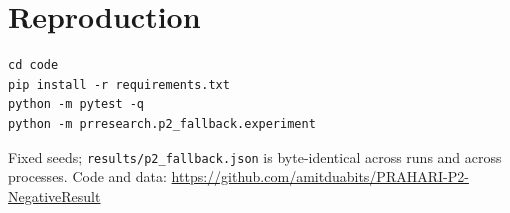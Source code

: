 \documentclass[11pt,a4paper]{article}
\begin{document}
\section*{Reproduction}

\begin{verbatim}
cd code
pip install -r requirements.txt
python -m pytest -q
python -m prresearch.p2_fallback.experiment
\end{verbatim}

Fixed seeds; \texttt{results/p2\_fallback.json} is byte-identical across runs and
across processes. Code and data:
\url{https://github.com/amitduabits/PRAHARI-P2-NegativeResult}



\end{document}
